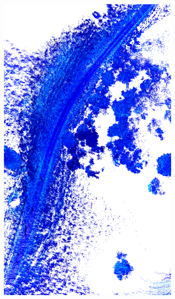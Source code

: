 \documentclass[numbered,pdftex]{ohio-etd}
\begin{document}
{{{{				\begin{figure}[H]
					\centering
					\begin{subfigure}{0.45\textwidth}
						\centering
						\includegraphics[width=1.0\linewidth]{Defense_Images/Pre-Manual_Classify_1}
						\caption[Bean Hollow Road Satellite View]{}
						\label{fig:Pre-Manual_Classify_1}
					\end{subfigure}
					\begin{subfigure}{0.45\textwidth}
						\centering

\end{subfigure}
\end{figure}}}}}
\end{document}
